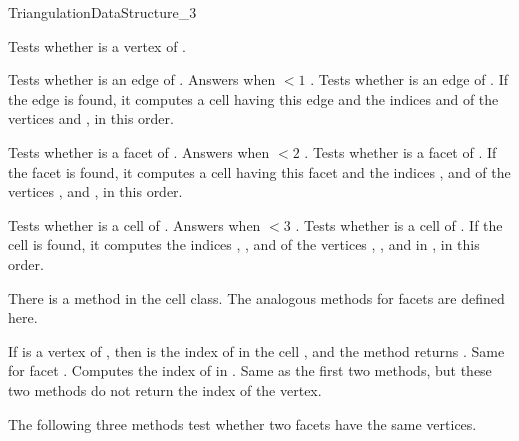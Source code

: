 \begin{ccRefConcept}{TriangulationDataStructure_3}

{Tests whether  is a vertex of \ccVar.}

{Tests whether  is an edge of \ccVar. Answers  when
 $<1$ .}
\ccGlue
{}
{Tests whether  is an edge of \ccVar. If the edge is found,
it computes a cell  having this edge and the indices 
and  of the vertices  and , in this order.}

{Tests whether  is a facet of \ccVar. Answers  when
 $<2$ .}
\ccGlue
{}
{Tests whether  is a facet of \ccVar. If the facet is found,
it computes a cell  having this facet and the indices ,
 and  of the vertices ,  and , in
this order.} 

{Tests whether  is a cell of \ccVar. Answers  when
 $<3$ .}
{Tests whether  is a cell of \ccVar. If the cell
 is found, it computes the indices , , 
and  of the vertices , ,  and  in
, in this order.} 

There is a method  in the cell class. The analogous
methods for facets are defined here.

{If  is a vertex of , then  is the index of
 in the cell , and the method returns .
}
\ccGlue
{}
{Same for facet . Computes the index  of  in
.}
\ccGlue
{}
{}
\ccGlue
{}
{Same as the first two methods, but these two methods do not return the
index of the vertex.}

The following three methods test whether two facets have the same
vertices.


\end{ccRefConcept}
